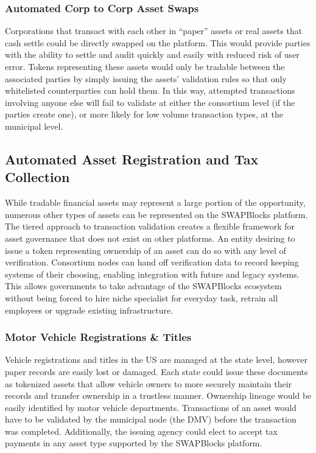 \documentclass[12pt]{article}
\begin{document}
\subsubsection{Automated Corp to Corp Asset Swaps}
Corporations that transact with each other in “paper” assets or real assets that cash settle could be directly 
swapped on the platform. This would provide parties with the ability to settle and audit quickly and easily with 
reduced risk of user error. Tokens representing these assets would only be tradable between the associated parties 
by simply issuing the assets' validation rules so that only whitelisted counterparties can hold them. In this way, 
attempted transactions involving anyone else will fail to validate at either the consortium level (if the parties 
create one), or more likely for low volume transaction types, at the municipal level.

\subsection{Automated Asset Registration and Tax Collection}

While tradable financial assets may represent a large portion of the opportunity, numerous other types of assets can be represented on the 
SWAPBlocks platform. The tiered approach to transaction validation creates a flexible framework for asset governance that does not exist 
on other platforms. An entity desiring to issue a token representing ownership of an asset can do so with any level of verification. 
Consortium nodes can hand off verification data to record keeping systems of their choosing, enabling integration with future and legacy 
systems.  This allows governments to take advantage of the SWAPBlocks ecosystem without being forced to hire niche specialist for everyday 
task, retrain all employees or upgrade existing infrastructure.

\subsubsection{Motor Vehicle Registrations \& Titles}
Vehicle registrations and titles in the US are managed at the state level, however paper records are easily lost 
or damaged. Each state could issue these documents as tokenized assets that allow vehicle owners to more securely maintain 
their records and transfer ownership in a trustless manner. Ownership lineage would be easily identified by motor vehicle departments. 
Transactions of an asset would have to be validated by the municipal node (the DMV) before the transaction was completed. 
Additionally, the issuing agency could elect to accept tax payments in any asset type supported by the SWAPBlocks platform.
\end{document}
